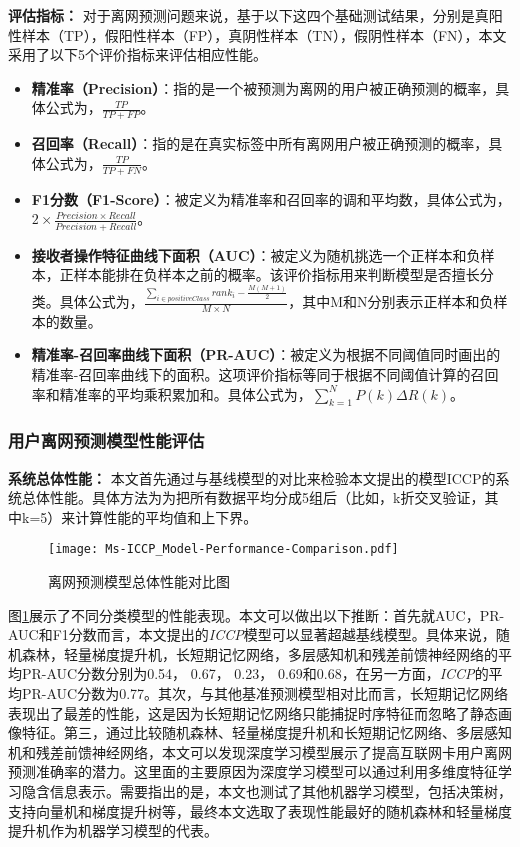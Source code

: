 \textbf{评估指标：}
对于离网预测问题来说，基于以下这四个基础测试结果，分别是真阳性样本（TP），假阳性样本（FP），真阴性样本（TN），假阴性样本（FN），本文采用了以下5个评价指标来评估相应性能。
\begin{itemize}
	\item \textbf{精准率（Precision）}：指的是一个被预测为离网的用户被正确预测的概率，具体公式为，$\frac{TP}{TP+FP}$。
	\item \textbf{召回率（Recall）}：指的是在真实标签中所有离网用户被正确预测的概率，具体公式为，$\frac{TP}{TP+FN}$。
	\item \textbf{F1分数（F1-Score）}：被定义为精准率和召回率的调和平均数，具体公式为，$2 \times \frac{Precision \times Recall}{Precision + Recall}$。
	\item \textbf{接收者操作特征曲线下面积（AUC）}：被定义为随机挑选一个正样本和负样本，正样本能排在负样本之前的概率。该评价指标用来判断模型是否擅长分类。具体公式为，$\frac{\sum_{i \in positiveClass}rank_{i} - \frac{M(M+1)}{2}}{M \times N}$，其中M和N分别表示正样本和负样本的数量。
	\item \textbf{精准率-召回率曲线下面积（PR-AUC）}：被定义为根据不同阈值同时画出的精准率-召回率曲线下的面积。这项评价指标等同于根据不同阈值计算的召回率和精准率的平均乘积累加和。具体公式为，$\sum_{k=1}^{N}P(k) \Delta
	 R(k)$。
\end{itemize}

\subsubsection{用户离网预测模型性能评估}
\textbf{系统总体性能：}
本文首先通过与基线模型的对比来检验本文提出的模型ICCP的系统总体性能。具体方法为为把所有数据平均分成5组后（比如，k折交叉验证，其中k=5）来计算性能的平均值和上下界。\par

\begin{figure}[hbt]
	\centering
	\texttt{[image: Ms-ICCP\_Model-Performance-Comparison.pdf]}
	\caption{离网预测模型总体性能对比图}
	\label{Fig:Model-Performance-Comparison}
\end{figure}

图\ref{Fig:Model-Performance-Comparison}展示了不同分类模型的性能表现。本文可以做出以下推断：首先就AUC，PR-AUC和F1分数而言，本文提出的\emph{ICCP}模型可以显著超越基线模型。具体来说，随机森林，轻量梯度提升机，长短期记忆网络，多层感知机和残差前馈神经网络的平均PR-AUC分数分别为0.54， 0.67， 0.23， 0.69和0.68，在另一方面，\emph{ICCP}的平均PR-AUC分数为0.77。其次，与其他基准预测模型相对比而言，长短期记忆网络表现出了最差的性能，这是因为长短期记忆网络只能捕捉时序特征而忽略了静态画像特征。第三，通过比较随机森林、轻量梯度提升机和长短期记忆网络、多层感知机和残差前馈神经网络，本文可以发现深度学习模型展示了提高互联网卡用户离网预测准确率的潜力。这里面的主要原因为深度学习模型可以通过利用多维度特征学习隐含信息表示。需要指出的是，本文也测试了其他机器学习模型，包括决策树，支持向量机和梯度提升树等，最终本文选取了表现性能最好的随机森林和轻量梯度提升机作为机器学习模型的代表。

